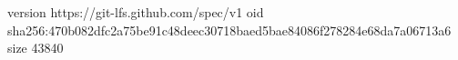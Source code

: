 version https://git-lfs.github.com/spec/v1
oid sha256:470b082dfc2a75be91c48deec30718baed5bae84086f278284e68da7a06713a6
size 43840
